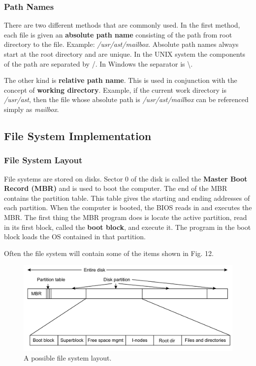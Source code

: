 \documentclass[11pt,a4paper]{article}
\begin{document}
\subsubsection{Path Names}
There are two different methods that are commonly used. In the first method, each file is given an \textbf{absolute path name} consisting of the path from root directory to the file. Example: \textit{/usr/ast/mailbox}. Absolute path names always start at the root directory and are unique. In the UNIX system the components of the path are separated by /. In Windows the separator is \textbackslash.

The other kind is \textbf{relative path name}. This is used in conjunction with the concept of \textbf{working directory}. Example, if the current work directory is \textit{/usr/ast}, then the file whose absolute path is \textit{/usr/ast/mailbox} can be referenced simply as \textit{mailbox}.

\subsection{File System Implementation}
\subsubsection{File System Layout}
File systems are stored on disks. Sector 0 of the disk is called the \textbf{Master Boot Record (MBR)} and is used to boot the computer. The end of the MBR contains the partition table. This table gives the starting and ending addresses of each partition. When the computer is booted, the BIOS reads in and executes the MBR. The first thing the MBR program does is locate the active partition, read in its first block, called the \textbf{boot block}, and execute it. The program in the boot block loads the OS contained in that partition. 

Often the file system will contain some of the items shown in Fig. 12. 

\begin{figure}[h!]
	\centering
		\includegraphics[width=\linewidth]{img/disk.pdf}
	\caption{A possible file system layout.}
\end{figure}
\end{document}
